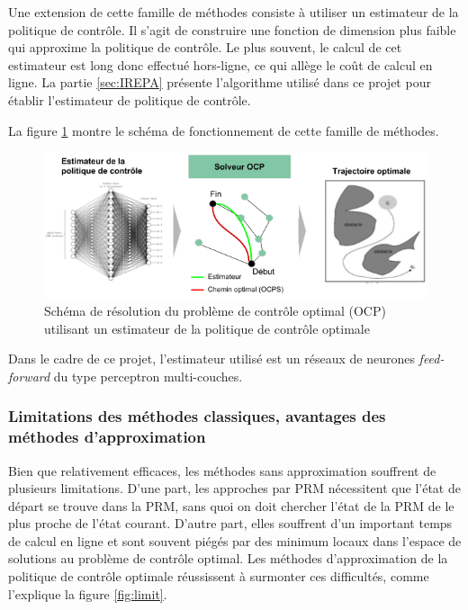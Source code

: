 \documentclass[a4paper,12pt]{report}
\begin{document}
Une extension de cette famille de méthodes consiste à utiliser un estimateur de la politique de contrôle. Il s'agit de construire une fonction de dimension plus faible qui approxime la politique de contrôle. Le plus souvent, le calcul de cet estimateur est long donc effectué hors-ligne, ce qui allège le coût de calcul en ligne. La partie \ref{sec:IREPA} présente l'algorithme utilisé dans ce projet pour établir l'estimateur de politique de contrôle.

La figure \ref{fig:NN} montre le schéma de fonctionnement de cette famille de méthodes. 

\begin{figure}[!htb]
\centering
\includegraphics[width=14cm]{image1_2.png}
\caption{Schéma de résolution du problème de contrôle optimal (OCP) utilisant un estimateur de la politique de contrôle optimale}
\label{fig:NN}
\end{figure}

Dans le cadre de ce projet, l'estimateur utilisé est un réseaux de neurones \textit{feed-forward} du type perceptron multi-couches.



\subsubsection{Limitations des méthodes classiques, avantages des méthodes d'approximation}
Bien que relativement efficaces, les méthodes sans approximation souffrent de plusieurs limitations. D'une part, les approches par PRM nécessitent que l'état de départ se trouve dans la PRM, sans quoi on doit chercher l'état de la PRM de le plus proche de l'état courant. D'autre part, elles souffrent d'un important temps de calcul en ligne et sont souvent piégés par des minimum locaux dans l'espace de solutions au problème de contrôle optimal. Les méthodes d'approximation de la politique de contrôle optimale réussissent à surmonter ces difficultés, comme l'explique la figure \ref{fig:limit}.
\end{document}
